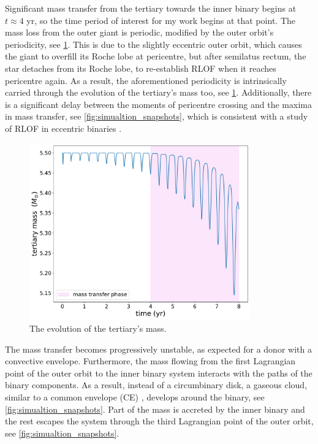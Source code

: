 Significant mass transfer from the tertiary towards the inner binary begins at $t \approx 4$ yr, so the time period of interest for my work begins at that point. The mass loss from the outer giant is periodic, modified by the outer orbit's periodicity, see \cref{fig:accretion_inc_00_mass_loss}. This is due to the slightly eccentric outer orbit, which causes the giant to overfill its Roche lobe at pericentre, but after semilatus rectum, the star detaches from its Roche lobe, to re-establish RLOF when it reaches pericentre again. As a result, the aforementioned periodicity is intrinsically carried through the evolution of the tertiary's mass too, see \cref{fig:accretion_inc_00_mass_loss}. Additionally, there is a significant delay between the moments of pericentre crossing and the maxima in mass transfer, see \cref{fig:simualtion_snapshots}, which is consistent with a study of RLOF in eccentric binaries \citep{lajoie2010mass}.
\begin{figure}[!htb]
    \centering
    \includegraphics[width=0.85\textwidth]{Thesis/graphs/inc_00/accretion_inc_00_mass_loss.pdf}
    \caption{The evolution of the tertiary's mass.}
    \label{fig:accretion_inc_00_mass_loss}
\end{figure}
The mass transfer becomes progressively unstable, as expected for a donor with a convective envelope. Furthermore, the mass flowing from the first Lagrangian point of the outer orbit to the inner binary system interacts with the paths of the binary components. As a result, instead of a circumbinary disk, a gaseous cloud, similar to a common envelope (CE) \citep{ivanova2013common}, develops around the binary, see \cref{fig:simualtion_snapshots}. Part of the mass is accreted by the inner binary and the rest escapes the system through the third Lagrangian point of the outer orbit, see \cref{fig:simualtion_snapshots}.

